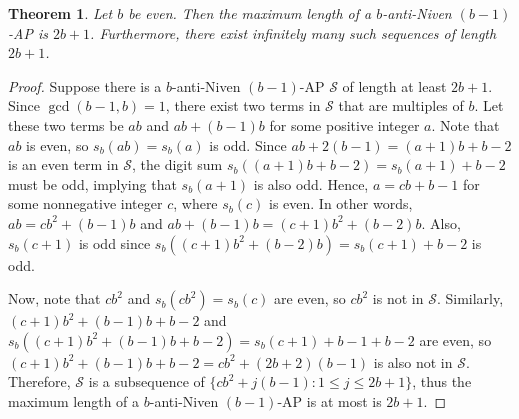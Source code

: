 \documentclass[10pt,a4paper]{amsart}
\newtheorem{theorem}{Theorem}
\begin{document}
\begin{theorem}\label{thm:bevenb-1AP}
Let $b$ be even. Then the maximum length of a $b$-anti-Niven $(b-1)$-AP is $2b+1$. Furthermore, there exist infinitely many such sequences of length $2b+1$.
\end{theorem}

\begin{proof}
Suppose there is a $b$-anti-Niven $(b-1)$-AP $\mathcal{S}$ of length at least $2b+1$. Since $\gcd(b-1,b)=1$, there exist two terms in $\mathcal{S}$ that are multiples of $b$. Let these two terms be $ab$ and $ab+(b-1)b$ for some positive integer $a$. Note that $ab$ is even, so $s_b(ab)=s_b(a)$ is odd. Since $ab+2(b-1)=(a+1)b+b-2$ is an even term in $\mathcal{S}$, the digit sum $s_b((a+1)b+b-2)=s_b(a+1)+b-2$ must be odd, implying that $s_b(a+1)$ is also odd. Hence, $a=cb+b-1$ for some nonnegative integer $c$, where $s_b(c)$ is even. In other words, $ab=cb^2+(b-1)b$ and $ab+(b-1)b=(c+1)b^2+(b-2)b$. Also, $s_b(c+1)$ is odd since $s_b((c+1)b^2+(b-2)b)=s_b(c+1)+b-2$ is odd.

Now, note that $cb^2$ and $s_b(cb^2)=s_b(c)$ are even, so $cb^2$ is not in $\mathcal{S}$. Similarly, $(c+1)b^2+(b-1)b+b-2$ and $s_b((c+1)b^2+(b-1)b+b-2)=s_b(c+1)+b-1+b-2$ are even, so $(c+1)b^2+(b-1)b+b-2=cb^2+(2b+2)(b-1)$ is also not in $\mathcal{S}$. Therefore, $\mathcal{S}$ is a subsequence of $\{cb^2+j(b-1):1\leq j\leq2b+1\}$, thus the maximum length of a $b$-anti-Niven $(b-1)$-AP is at most is $2b+1$.


\end{proof}
\end{document}
